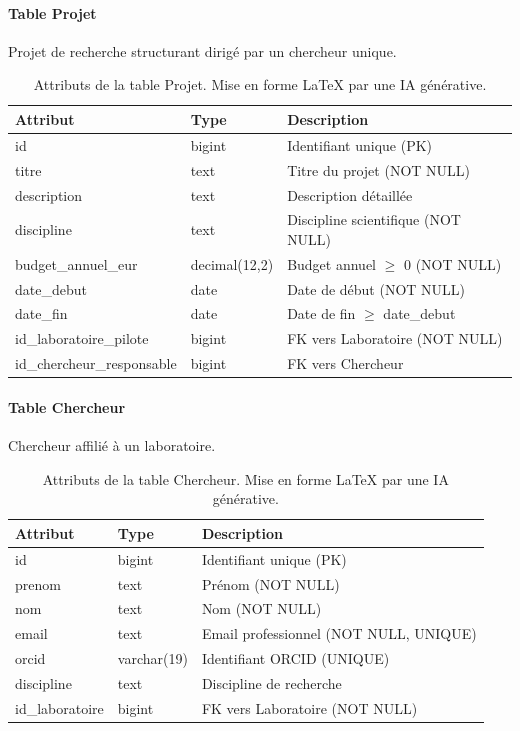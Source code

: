 \documentclass[12pt,a4paper]{article}
\begin{document}
\paragraph{Table Projet}
Projet de recherche structurant dirigé par un chercheur unique.

\begin{table}[H]
\centering
\small
\begin{tabular}{@{}llp{5cm}@{}}
\toprule
\textbf{Attribut} & \textbf{Type} & \textbf{Description} \\ \midrule
id & bigint & Identifiant unique (PK) \\
titre & text & Titre du projet (NOT NULL) \\
description & text & Description détaillée \\
discipline & text & Discipline scientifique (NOT NULL) \\
budget\_annuel\_eur & decimal(12,2) & Budget annuel $\geq$ 0 (NOT NULL) \\
date\_debut & date & Date de début (NOT NULL) \\
date\_fin & date & Date de fin $\geq$ date\_debut \\
id\_laboratoire\_pilote & bigint & FK vers Laboratoire (NOT NULL) \\
id\_chercheur\_responsable & bigint & FK vers Chercheur \\ \bottomrule
\end{tabular}
\caption{Attributs de la table Projet. Mise en forme LaTeX par une IA générative.}
\end{table}


\paragraph{Table Chercheur}
Chercheur affilié à un laboratoire.

\begin{table}[H]
\centering
\small
\begin{tabular}{@{}llp{6cm}@{}}
\toprule
\textbf{Attribut} & \textbf{Type} & \textbf{Description} \\ \midrule
id & bigint & Identifiant unique (PK) \\
prenom & text & Prénom (NOT NULL) \\
nom & text & Nom (NOT NULL) \\
email & text & Email professionnel (NOT NULL, UNIQUE) \\
orcid & varchar(19) & Identifiant ORCID (UNIQUE) \\
discipline & text & Discipline de recherche \\
id\_laboratoire & bigint & FK vers Laboratoire (NOT NULL) \\ \bottomrule
\end{tabular}
\caption{Attributs de la table Chercheur. Mise en forme LaTeX par une IA générative.}
\end{table}
\end{document}
